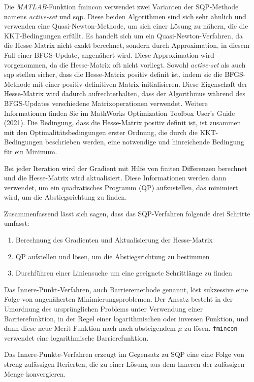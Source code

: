 Die \textit{MATLAB}-Funktion fmincon verwendet zwei Varianten der SQP-Methode namens \textit{active-set} und sqp. Diese beiden Algorithmen sind sich sehr ähnlich und verwenden eine Quasi-Newton-Methode, um sich einer Lösung zu nähern, die die KKT-Bedingungen erfüllt. Es handelt sich um ein Quasi-Newton-Verfahren, da die Hesse-Matrix nicht exakt berechnet, sondern durch Approximation, in diesem Fall einer BFGS-Update, angenähert wird. Diese Approximation wird vorgenommen, da die Hesse-Matrix oft nicht vorliegt. Sowohl \textit{active-set} als auch sqp stellen sicher, dass die Hesse-Matrix positiv definit ist, indem sie die BFGS-Methode mit einer positiv definitiven Matrix initialisieren. Diese Eigenschaft der Hesse-Matrix wird dadurch aufrechterhalten, dass der Algorithmus während des BFGS-Updates verschiedene Matrixoperationen verwendet. Weitere Informationen finden Sie im MathWorks Optimization Toolbox User's Guide (2021). Die Bedingung, dass die Hesse-Matrix positiv definit ist, ist zusammen mit den Optimalitätsbedingungen erster Ordnung, die durch die KKT-Bedingungen beschrieben werden, eine notwendige und hinreichende Bedingung für ein Minimum. 

Bei jeder Iteration wird der Gradient mit Hilfe von finiten Differenzen berechnet und die Hesse-Matrix wird aktualisiert. Diese Informationen werden dann verwendet, um ein quadratisches Programm (QP) aufzustellen, das minimiert wird, um die Abstiegsrichtung zu finden.

Zusammenfassend lässt sich sagen, dass das SQP-Verfahren folgende drei Schritte umfasst:
\begin{enumerate}
    \item Berechnung des Gradienten und Aktualisierung der Hesse-Matrix
    \item QP aufstellen und lösen, um die Abstiegsrichtung zu bestimmen
    \item Durchführen einer Liniensuche um eine geeignete Schrittlänge zu finden
\end{enumerate}

Das Innere-Punkt-Verfahren, auch Barrieremethode genannt, löst sukzessive eine Folge von angenäherten Minimierungsproblemen. Der Ansatz besteht in der Umordnung des ursprünglichen Problems unter Verwendung einer Barrierefunktion, in der Regel einer logarithmischen oder inversen Funktion, und dann diese neue Merit-Funktion nach nach absteigendem $\mu$ zu lösen. \texttt{fmincon} verwendet eine logarithmische Barrierefunktion.

Das Innere-Punkte-Verfahren erzeugt im Gegensatz zu SQP eine eine Folge von streng zulässigen Iterierten, die zu einer Lösung aus dem Inneren der zulässigen Menge konvergieren.

